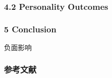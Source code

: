 \documentclass{beamer}
\begin{document}
\begin{frame}
	\frametitle{4.2 Personality Outcomes}
\end{frame}


\begin{frame}
	\frametitle{5 Conclusion}
负面影响
\end{frame}




\begin{frame}
    \frametitle{参考文献}


\end{frame}

\end{document}
